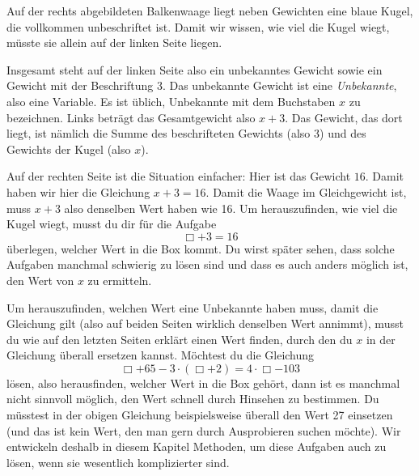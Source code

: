 \documentclass[../../main.tex]{subfiles}
\begin{document}
\begin{example}{}
    
    Auf der rechts abgebildeten Balkenwaage liegt neben Gewichten eine blaue Kugel, die vollkommen unbeschriftet ist. Damit wir wissen, wie viel die Kugel wiegt, müsste sie allein auf der linken Seite liegen.
    
    Insgesamt steht auf der linken Seite also ein unbekanntes Gewicht sowie ein Gewicht mit der Beschriftung 3. Das unbekannte Gewicht ist eine \emph{Unbekannte}, also eine Variable. Es ist üblich, Unbekannte mit dem Buchstaben $x$ zu bezeichnen. Links beträgt das Gesamtgewicht also $x+3$. Das Gewicht, das dort liegt, ist nämlich die Summe des beschrifteten Gewichts (also 3) und des Gewichts der Kugel (also $x$).
    
    Auf der rechten Seite ist die Situation einfacher: Hier ist das Gewicht $16$. Damit haben wir hier die Gleichung $x+3=16$. Damit die Waage im Gleichgewicht ist, muss $x+3$ also denselben Wert haben wie 16. Um herauszufinden, wie viel die Kugel wiegt, musst du dir für die Aufgabe 
    \[\Box+3=16\] 
    überlegen, welcher Wert in die Box kommt. Du wirst später sehen, dass solche Aufgaben manchmal schwierig zu lösen sind und dass es auch anders möglich ist, den Wert von $x$ zu ermitteln.
\end{example}

Um herauszufinden, welchen Wert eine Unbekannte haben muss, damit die Gleichung gilt (also auf beiden Seiten wirklich denselben Wert annimmt), musst du wie auf den letzten Seiten erklärt einen Wert finden, durch den du $x$ in der Gleichung überall ersetzen kannst. Möchtest du die Gleichung
\[\Box+65-3\cdot(\Box+2)=4\cdot \Box-103\]
lösen, also herausfinden, welcher Wert in die Box gehört, dann ist es manchmal nicht sinnvoll möglich, den Wert schnell durch Hinsehen zu bestimmen. Du müsstest in der obigen Gleichung beispielsweise überall den Wert 27 einsetzen (und das ist kein Wert, den man gern durch Ausprobieren suchen möchte). Wir entwickeln deshalb in diesem Kapitel Methoden, um diese Aufgaben auch zu lösen, wenn sie wesentlich komplizierter sind.
\end{document}
